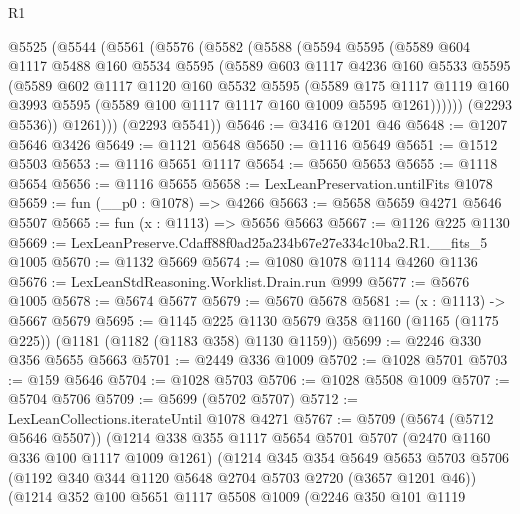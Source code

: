 \begin{lexlean}{R1}
\begin{coremodule}
  @5525
    (@5544
      (@5561
        (@5576
          (@5582
            (@5588
              (@5594
                @5595
                (@5589
                  @604
                  @1117
                  @5488
                  @160
                  @5534
                  @5595
                  (@5589
                    @603
                    @1117
                    @4236
                    @160
                    @5533
                    @5595
                    (@5589
                      @602
                      @1117
                      @1120
                      @160
                      @5532
                      @5595
                      (@5589
                        @175
                        @1117
                        @1119
                        @160
                        @3993
                        @5595
                        (@5589 @100 @1117 @1117 @160 @1009 @5595 @1261))))))
              (@2293 @5536))
            @1261)))
      (@2293 @5541))
@5646 := @3416 @1201 @46
@5648 := @1207 @5646 @3426
@5649 := @1121 @5648
@5650 := @1116 @5649
@5651 := @1512 @5503
@5653 := @1116 @5651 @1117
@5654 := @5650 @5653
@5655 := @1118 @5654
@5656 := @1116 @5655
@5658 := LexLeanPreservation.untilFits @1078
@5659 := fun (__p0 : @1078) => @4266
@5663 := @5658 @5659 @4271 @5646 @5507
@5665 := fun (x : @1113) => @5656 @5663
@5667 := @1126 @225 @1130
@5669 := LexLeanPreserve.Cdaff88f0ad25a234b67e27e334c10ba2.R1.__fits_5 @1005
@5670 := @1132 @5669
@5674 := @1080 @1078 @1114 @4260 @1136
@5676 := LexLeanStdReasoning.Worklist.Drain.run @999
@5677 := @5676 @1005
@5678 := @5674 @5677
@5679 := @5670 @5678
@5681 := (x : @1113) -> @5667 @5679
@5695 := @1145
    @225
    @1130
    @5679
    @358
    @1160
    (@1165 (@1175 @225))
    (@1181 (@1182 (@1183 @358) @1130 @1159))
@5699 := @2246 @330 @356 @5655 @5663
@5701 := @2449 @336 @1009
@5702 := @1028 @5701
@5703 := @159 @5646
@5704 := @1028 @5703
@5706 := @1028 @5508 @1009
@5707 := @5704 @5706
@5709 := @5699 (@5702 @5707)
@5712 := LexLeanCollections.iterateUntil @1078 @4271
@5767 := @5709
    (@5674 (@5712 @5646 @5507))
    (@1214
      @338
      @355
      @1117
      @5654
      @5701
      @5707
      (@2470 @1160 @336 @100 @1117 @1009 @1261)
      (@1214
        @345
        @354
        @5649
        @5653
        @5703
        @5706
        (@1192 @340 @344 @1120 @5648 @2704 @5703 @2720 (@3657 @1201 @46))
        (@1214
          @352
          @100
          @5651
          @1117
          @5508
          @1009
          (@2246
            @350
            @101
            @1119

\end{coremodule}
\end{lexlean}
